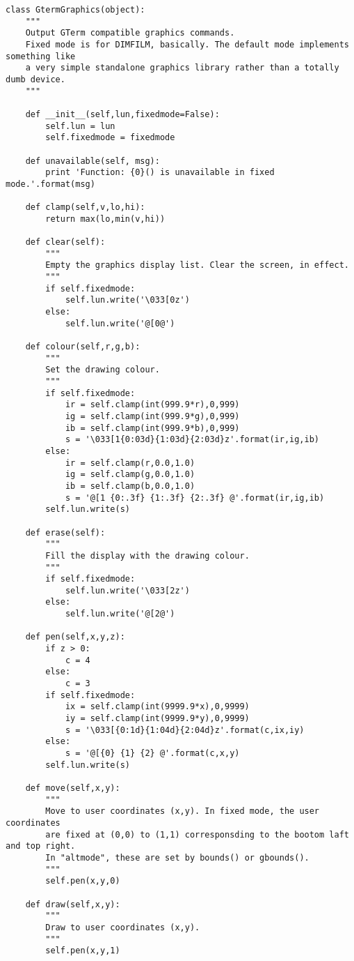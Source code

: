 \documentclass[a4paper,twoside,11pt]{article}
\begin{document}
\begin{lstlisting}
class GtermGraphics(object):
    """
    Output GTerm compatible graphics commands.
    Fixed mode is for DIMFILM, basically. The default mode implements something like
    a very simple standalone graphics library rather than a totally dumb device.
    """

    def __init__(self,lun,fixedmode=False):
        self.lun = lun
        self.fixedmode = fixedmode

    def unavailable(self, msg):
        print 'Function: {0}() is unavailable in fixed mode.'.format(msg)

    def clamp(self,v,lo,hi):
        return max(lo,min(v,hi))

    def clear(self):
        """
        Empty the graphics display list. Clear the screen, in effect.
        """
        if self.fixedmode:
            self.lun.write('\033[0z')
        else:
            self.lun.write('@[0@')

    def colour(self,r,g,b):
        """
        Set the drawing colour.
        """
        if self.fixedmode:
            ir = self.clamp(int(999.9*r),0,999)
            ig = self.clamp(int(999.9*g),0,999)
            ib = self.clamp(int(999.9*b),0,999)
            s = '\033[1{0:03d}{1:03d}{2:03d}z'.format(ir,ig,ib)
        else:
            ir = self.clamp(r,0.0,1.0)
            ig = self.clamp(g,0.0,1.0)
            ib = self.clamp(b,0.0,1.0)
            s = '@[1 {0:.3f} {1:.3f} {2:.3f} @'.format(ir,ig,ib)
        self.lun.write(s)

    def erase(self):
        """
        Fill the display with the drawing colour.
        """
        if self.fixedmode:
            self.lun.write('\033[2z')
        else:
            self.lun.write('@[2@')

    def pen(self,x,y,z):
        if z > 0:
            c = 4
        else:
            c = 3
        if self.fixedmode:
            ix = self.clamp(int(9999.9*x),0,9999)
            iy = self.clamp(int(9999.9*y),0,9999)
            s = '\033[{0:1d}{1:04d}{2:04d}z'.format(c,ix,iy)
        else:
            s = '@[{0} {1} {2} @'.format(c,x,y)
        self.lun.write(s)

    def move(self,x,y):
        """
        Move to user coordinates (x,y). In fixed mode, the user coordinates
        are fixed at (0,0) to (1,1) corresponsding to the bootom laft and top right.
        In "altmode", these are set by bounds() or gbounds().
        """
        self.pen(x,y,0)

    def draw(self,x,y):
        """
        Draw to user coordinates (x,y).
        """
        self.pen(x,y,1)


\end{lstlisting}
\end{document}
